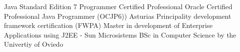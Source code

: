 %
%
%


\begin{scholarship}
					{Java Standard Edition 7 Programmer Certified Professional}
					{Oracle Certified Professional Java Programmer (OCJP6))}
					{Asturias Principality development framework certification (FWPA)}
					{Master in development of Enterprise Applications using J2EE - Sun Microsistems}
					{BSc in Computer Science by the Univertiy of Oviedo}
\end{scholarship}